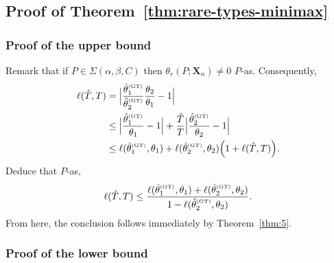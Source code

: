 \documentclass{article}
\newcommand{\1}{\boldsymbol{1}}
\theoremstyle{plain}
\begin{document}
\subsection{Proof of Theorem~\ref{thm:rare-types-minimax}}
\label{sec:proof-theorem-rare-types-minimax}

\subsubsection{Proof of the upper bound}
\label{sec:proof-upper-bound}

Remark that if $P \in \Sigma(\alpha,\beta,C)$ then $\theta_r(P;\mathbf{X}_n) \ne 0$ $P$-as. Consequently,
\begin{align*}
  \ell(\hat{T},T)%
  &=%
    \Big|\frac{\hat{\theta}_1^{\text{\tiny{(GT)}}}}{\hat{\theta}_2^{\text{\tiny{(GT)}}}}\frac{\theta_2}{\theta_1} - 1 \Big|\\%
  &\leq \Big|\frac{\hat{\theta}_1^{\text{\tiny{(GT)}}}}{\theta_1} - 1 \Big|%
    + \frac{\hat{T}}{T}\Big|\frac{\hat{\theta}_2^{\text{\tiny{(GT)}}}}{\theta_2} - 1 \Big|\\
  &\leq \ell(\hat{\theta}_1^{\text{\tiny{(GT)}}},\theta_1)%
    + \ell(\hat{\theta}_2^{\text{\tiny{(GT)}}},\theta_2)\Big(1 + \ell(\hat{T},T)\Big).
\end{align*}
Deduce that $P$-as,
\begin{equation*}
  \ell(\hat{T},T)%
  \leq\frac{\ell(\hat{\theta}_1^{\text{\tiny{(GT)}}},\theta_1) + \ell(\hat{\theta}_2^{\text{\tiny{(GT)}}},\theta_2)}{1 - \ell(\hat{\theta}_2^{\text{\tiny{(GT)}}},\theta_2)}.
\end{equation*}
From here, the conclusion follows immediately by Theorem~\ref{thm:5}.


\subsubsection{Proof of the lower bound}
\label{sec:proof-lower-bound}
\end{document}
